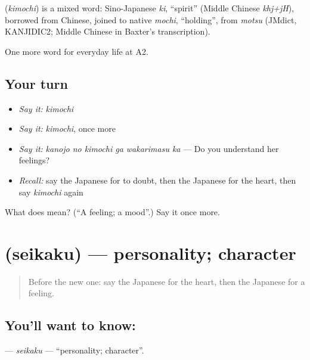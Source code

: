 \begin{cousinweb}
\textbf{} (\emph{kimochi}) is a mixed word: Sino-Japanese \emph{ki}, \textquotedblleft{}spirit\textquotedblright{} (Middle Chinese \emph{khj+jH}), borrowed from Chinese, joined to native \emph{mochi}, \textquotedblleft{}holding\textquotedblright{}, from \emph{motsu} (JMdict, KANJIDIC2; Middle Chinese in Baxter's transcription).
\end{cousinweb}

\begin{grammarlens}[title={What you've built}]
One more word for everyday life at A2.
\end{grammarlens}

\subsection*{Your turn}
\begin{itemize}
\raggedright
  \item \emph{Say it:} \emph{kimochi}
  \item \emph{Say it:} \emph{kimochi}, once more
  \item \emph{Say it:} \emph{kanojo no kimochi ga wakarimasu ka} — Do you understand her feelings?
  \item \emph{Recall:} say the Japanese for to doubt, then the Japanese for the heart, then say \emph{kimochi} again
\end{itemize}

\begin{tcolorbox}[breakable,colback=teal!4,colframe=teal!35!black,title={Before you move on}]
What does  mean? (\textquotedblleft{}A feeling; a mood\textquotedblright{}.) Say it once more.
\end{tcolorbox}
\section[\texorpdfstring{\ja{せいかく} (seikaku)}{せいかく (seikaku)}]{ (seikaku) — personality; character}

\label{lesson:JA-C249-seikaku}



\begin{quote}
Before the new one: say the Japanese for the heart, then the Japanese for a feeling.
\end{quote}

\subsection*{You'll want to know: }
\textbf{} — \emph{seikaku} — \textquotedblleft{}personality; character\textquotedblright{}.

